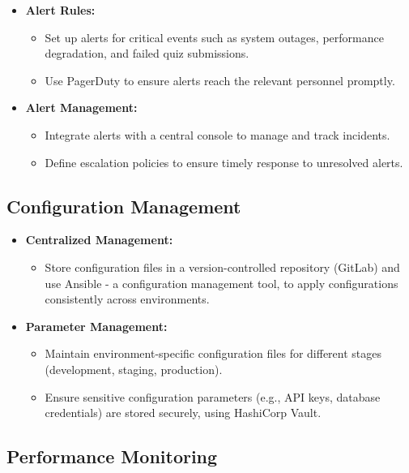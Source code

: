 \begin{itemize}
    \item \textbf{Alert Rules:}
          \begin{itemize}
              \item Set up alerts for critical events such as system outages, performance degradation, and failed quiz submissions.
              \item Use PagerDuty to ensure alerts reach the relevant personnel promptly.
          \end{itemize}
    \item \textbf{Alert Management:}
          \begin{itemize}
              \item Integrate alerts with a central console to manage and track incidents.
              \item Define escalation policies to ensure timely response to unresolved alerts.
          \end{itemize}
\end{itemize}


\subsection{Configuration Management}

\begin{itemize}
    \item \textbf{Centralized Management:}
          \begin{itemize}
              \item Store configuration files in a version-controlled repository (GitLab) and use Ansible - a configuration management tool, to apply configurations consistently across environments.
          \end{itemize}
    \item \textbf{Parameter Management:}
          \begin{itemize}
              \item Maintain environment-specific configuration files for different stages (development, staging, production).
              \item Ensure sensitive configuration parameters (e.g., API keys, database credentials) are stored securely, using HashiCorp Vault.
          \end{itemize}
\end{itemize}


\subsection{Performance Monitoring}

